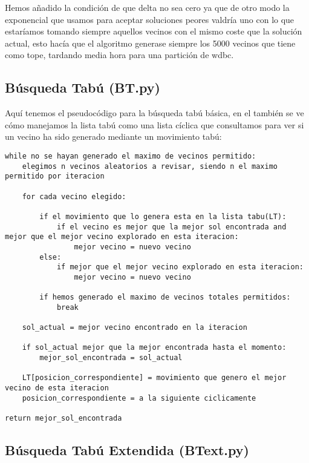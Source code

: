\documentclass[10pt,a4paper]{article}
\begin{document}
Hemos añadido la condición de que delta no sea cero ya que de otro modo la exponencial que usamos para aceptar soluciones peores valdría uno con lo que estaríamos tomando siempre aquellos vecinos con el mismo coste que la solución actual, esto hacía que el algoritmo generase siempre los 5000 vecinos que tiene como tope, tardando media hora para una partición de wdbc.\\

\newpage
\subsection{\color[rgb]{0.0,0.0,0.51}Búsqueda Tabú (BT.py)}

Aquí tenemos el pseudocódigo para la búsqueda tabú básica, en el también se ve cómo manejamos la lista tabú como una lista cíclica que consultamos para ver si un vecino ha sido generado mediante un movimiento tabú:\\

\begin{lstlisting}
while no se hayan generado el maximo de vecinos permitido:
	elegimos n vecinos aleatorios a revisar, siendo n el maximo permitido por iteracion

	for cada vecino elegido:

		if el movimiento que lo genera esta en la lista tabu(LT):
			if el vecino es mejor que la mejor sol encontrada and mejor que el mejor vecino explorado en esta iteracion:
				mejor vecino = nuevo vecino
		else:
			if mejor que el mejor vecino explorado en esta iteracion:
				mejor vecino = nuevo vecino

		if hemos generado el maximo de vecinos totales permitidos:
			break

	sol_actual = mejor vecino encontrado en la iteracion

	if sol_actual mejor que la mejor encontrada hasta el momento:
		mejor_sol_encontrada = sol_actual

	LT[posicion_correspondiente] = movimiento que genero el mejor vecino de esta iteracion
	posicion_correspondiente = a la siguiente ciclicamente

return mejor_sol_encontrada
\end{lstlisting}

\newpage
\subsection{\color[rgb]{0.0,0.0,0.51}Búsqueda Tabú Extendida (BText.py)}
\end{document}
